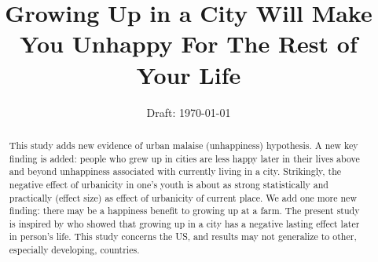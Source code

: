 \documentclass[10pt, letterpaper]{article}
\date{Draft: {}\today}
\title{
Growing Up in a City Will Make You Unhappy For The Rest of Your Life
}
\author{
}
\begin{document}


\maketitle
\vspace{-.4in}
\begin{center}

\end{center}


\begin{abstract}
\noindent This study adds new evidence %
of urban malaise (unhappiness)
hypothesis. %
 A new key finding is added: people who
grew up in cities are less happy later in their lives above and beyond
  unhappiness associated with currently living in a city. 
%
 Strikingly, the negative effect of urbanicity in one's youth is about as
 strong statistically and practically (effect size) as effect of urbanicity of
 current place. 
%
%
 We add one more new finding: there may be a happiness benefit to growing up at a farm.
%
The present study is inspired by \citet{lederbogen11} who
showed that growing up in a city has a negative lasting effect later in person's
life. This study concerns the US, and results  may not generalize to other,
especially developing, countries. 
\end{abstract}
\vspace{.15in} 
\end{document}
